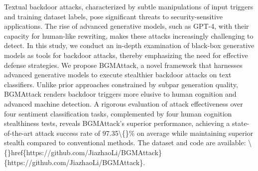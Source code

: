 Textual backdoor attacks, characterized by subtle manipulations of input triggers and training dataset labels, pose significant threats to security-sensitive applications. The rise of advanced generative models, such as GPT-4, with their capacity for human-like rewriting, makes these attacks increasingly challenging to detect. In this study, we conduct an in-depth examination of black-box generative models as tools for backdoor attacks, thereby emphasizing the need for effective defense strategies. We propose BGMAttack, a novel framework that harnesses advanced generative models to execute stealthier backdoor attacks on text classifiers. Unlike prior approaches constrained by subpar generation quality, BGMAttack renders backdoor triggers more elusive to human cognition and advanced machine detection. A rigorous evaluation of attack effectiveness over four sentiment classification tasks, complemented by four human cognition stealthiness tests, reveals BGMAttack’s superior performance, achieving a state-of-the-art attack success rate of 97.35\textbackslash\{\}\% on average while maintaining superior stealth compared to conventional methods. The dataset and code are available: \textbackslash\{\}href\{https://github.com/JiazhaoLi/BGMAttack\}\{https://github.com/JiazhaoLi/BGMAttack\}.